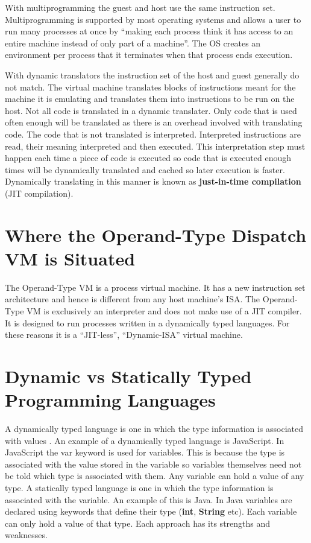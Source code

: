 \documentclass[english,a4paper]{report}
\begin{document}
With multiprogramming the guest and host use the same instruction
set. Multiprogramming is supported by most operating systems and
allows a user to run many processes at once by ``making each process
think it has access to an entire machine instead of only part of a
machine''\cite[pg13]{JamesE.Smith2005}. The OS creates an environment
per process that it terminates when that process ends execution.

With dynamic translators the instruction set of the host and guest
generally do not match. The virtual machine translates blocks of
instructions meant for the machine it is emulating and translates them
into instructions to be run on the host. Not all code is translated in
a dynamic translater. Only code that is used often enough will be
translated as there is an overhead involved with translating code. The
code that is not translated is interpreted. Interpreted instructions
are read, their meaning interpreted and then executed. This
interpretation step must happen each time a piece of code is executed
so code that is executed enough times will be dynamically translated
and cached so later execution is faster. Dynamically translating in
this manner is known as \textbf{just-in-time compilation} (JIT
compilation).

\section{Where the Operand-Type Dispatch VM is Situated}
The Operand-Type VM is a process virtual machine. It has a new
instruction set architecture and hence is different from any host
machine's ISA. The Operand-Type VM is exclusively an interpreter and
does not make use of a JIT compiler. It is designed to run processes
written in a dynamically typed languages. For these reasons it is a
``JIT-less'', ``Dynamic-ISA'' virtual machine. 

\section{Dynamic vs Statically Typed Programming Languages}
A dynamically typed language is one in which the type information is
associated with values \cite[pg4]{RobertoIerusalimschy}. An example of
a dynamically typed language is JavaScript. In JavaScript the var
keyword is used for variables. This is because the type is associated
with the value stored in the variable so variables themselves need not
be told which type is associated with them. Any variable can hold a
value of any type. A statically typed language is one in which the
type information is associated with the variable. An example of this
is Java. In Java variables are declared using keywords that define
their type (\textbf{int}, \textbf{String} etc). Each variable can only
hold a value of that type. Each approach has its strengths and
weaknesses.
\end{document}
